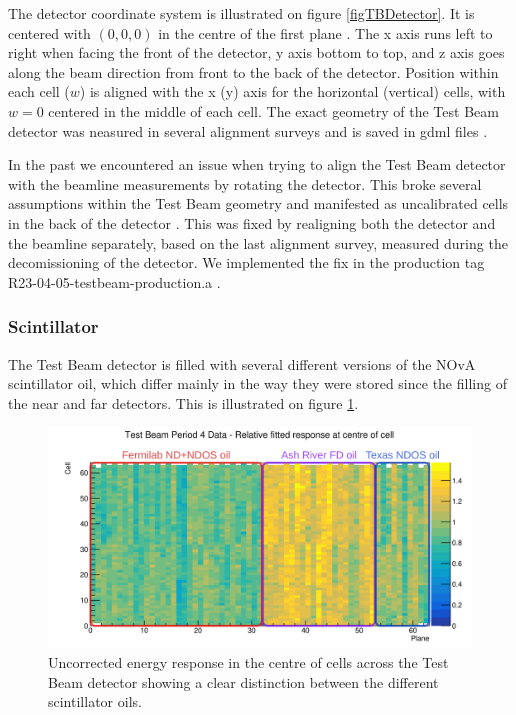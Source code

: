 \documentclass[12pt,a4paper]{article}
\begin{document}
The detector coordinate system is illustrated on figure \ref{figTBDetector}. It is centered with $\left(0,0,0\right)$ in the centre of the first plane \cite{NOVA-doc-58388}. The x axis runs left to right when facing the front of the detector, y axis bottom to top, and z axis goes along the beam direction from front to the back of the detector. Position within each cell ($w$) is aligned with the x (y) axis for the horizontal (vertical) cells, with $w=0$ centered in the middle of each cell. The exact geometry of the Test Beam detector was neasured in several alignment surveys and is saved in gdml files \cite{NOVA-doc-57955}.

In the past we encountered an issue when trying to align the Test Beam detector with the beamline measurements by rotating the detector. This broke several assumptions within the Test Beam geometry \cite{NOVA-doc-58388} and manifested as uncalibrated cells in the back of the detector \cite{NOVA-doc-57516-v2}. This was fixed by realigning both the detector and the beamline separately, based on the last alignment survey, measured during the decomissioning of the detector. We implemented the fix in the production tag R23-04-05-testbeam-production.a \cite{NOVA-doc-58388}.


\subsubsection*{Scintillator}
The Test Beam detector is filled with several different versions of the NOvA scintillator oil, which differ mainly in the way they were stored since the filling of the near and far detectors. This is illustrated on figure \ref{figScintillators}.

\begin{figure}[!ht]
\centering
\includegraphics[width=\textwidth]{Plots/TestBeamScintillatorOils.png}
\caption{Uncorrected energy response in the centre of cells across the Test Beam detector showing a clear distinction between the different scintillator oils.}
\label{figScintillators}
\end{figure}
\end{document}
